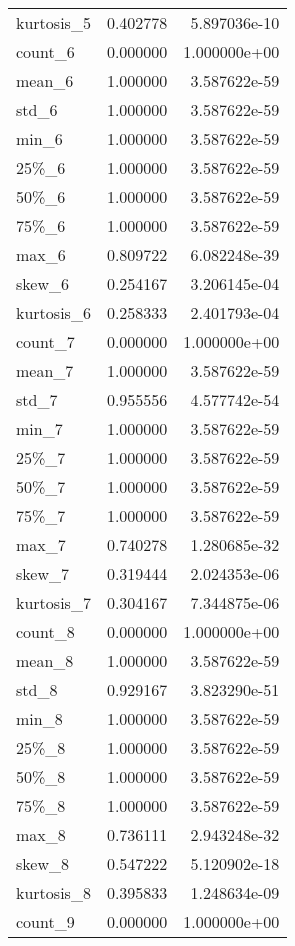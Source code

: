 \begin{longtable}{lrr}
kurtosis\_5 &  0.402778 &  5.897036e-10 \\
count\_6    &  0.000000 &  1.000000e+00 \\
mean\_6     &  1.000000 &  3.587622e-59 \\
std\_6      &  1.000000 &  3.587622e-59 \\
min\_6      &  1.000000 &  3.587622e-59 \\
25\%\_6      &  1.000000 &  3.587622e-59 \\
50\%\_6      &  1.000000 &  3.587622e-59 \\
75\%\_6      &  1.000000 &  3.587622e-59 \\
max\_6      &  0.809722 &  6.082248e-39 \\
skew\_6     &  0.254167 &  3.206145e-04 \\
kurtosis\_6 &  0.258333 &  2.401793e-04 \\
count\_7    &  0.000000 &  1.000000e+00 \\
mean\_7     &  1.000000 &  3.587622e-59 \\
std\_7      &  0.955556 &  4.577742e-54 \\
min\_7      &  1.000000 &  3.587622e-59 \\
25\%\_7      &  1.000000 &  3.587622e-59 \\
50\%\_7      &  1.000000 &  3.587622e-59 \\
75\%\_7      &  1.000000 &  3.587622e-59 \\
max\_7      &  0.740278 &  1.280685e-32 \\
skew\_7     &  0.319444 &  2.024353e-06 \\
kurtosis\_7 &  0.304167 &  7.344875e-06 \\
count\_8    &  0.000000 &  1.000000e+00 \\
mean\_8     &  1.000000 &  3.587622e-59 \\
std\_8      &  0.929167 &  3.823290e-51 \\
min\_8      &  1.000000 &  3.587622e-59 \\
25\%\_8      &  1.000000 &  3.587622e-59 \\
50\%\_8      &  1.000000 &  3.587622e-59 \\
75\%\_8      &  1.000000 &  3.587622e-59 \\
max\_8      &  0.736111 &  2.943248e-32 \\
skew\_8     &  0.547222 &  5.120902e-18 \\
kurtosis\_8 &  0.395833 &  1.248634e-09 \\
count\_9    &  0.000000 &  1.000000e+00 \\

\end{longtable}
